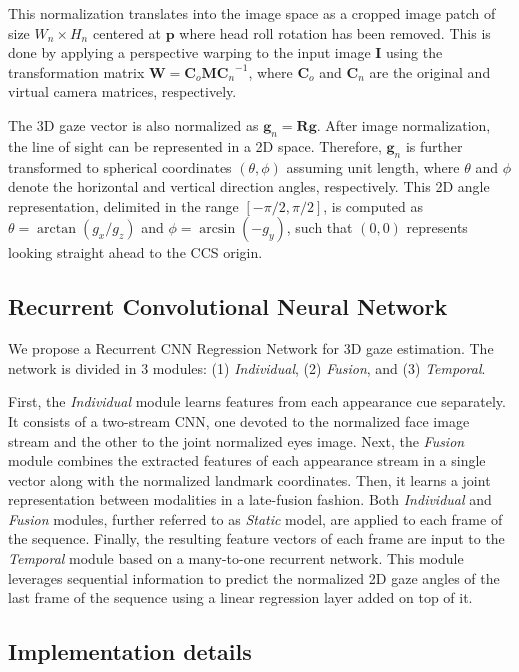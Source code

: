 \documentclass{bmvc2k}
\begin{document}
This normalization translates into the image space as a cropped image patch of size $W_n \times H_n$ centered at $\mathbf{p}$ where head roll rotation has been removed. This is done by applying a perspective warping to the input image $\mathbf{I}$ using the transformation matrix $\mathbf{W} = \mathbf{C}_o\mathbf{M}{\mathbf{C}_n}^{-1}$, where $\mathbf{C}_o$ and $\mathbf{C}_n$ are the original and virtual camera matrices, respectively.

The 3D gaze vector is also normalized as $\mathbf{g}_n = \mathbf{R}\mathbf{g}$. After image normalization, the line of sight can be represented in a 2D space. Therefore, $\mathbf{g}_n$ is further transformed to spherical coordinates $(\theta,\phi)$ assuming unit length, where $\theta$ and $\phi$ denote the horizontal and vertical direction angles, respectively. This 2D angle representation, delimited in the range $[-\pi/2, \pi/2]$, is computed as $\theta = \arctan(g_x / g_z)$ and $\phi = \arcsin(-g_y)$, such that $(0,0)$ represents looking straight ahead to the CCS origin.

\subsection{Recurrent Convolutional Neural Network}
\label{sec:arch}

We propose a Recurrent CNN Regression Network for 3D gaze estimation. The network is divided in 3 modules: (1) \textit{Individual}, (2) \textit{Fusion}, and (3) \textit{Temporal}. 

First, the \textit{Individual} module learns features from each appearance cue separately. It consists of a two-stream CNN, one devoted to the normalized face image stream and the other to the joint normalized eyes image. Next, the \textit{Fusion} module combines the extracted features of each appearance stream in a single vector along with the normalized landmark coordinates. Then, it learns a joint representation between modalities in a late-fusion fashion. Both \textit{Individual} and \textit{Fusion} modules, further referred to as \textit{Static} model, are applied to each frame of the sequence. Finally, the resulting feature vectors of each frame are input to the \textit{Temporal} module based on a many-to-one recurrent network. This module leverages sequential information to predict the normalized 2D gaze angles of the last frame of the sequence using a linear regression layer added on top of it. 

\subsection{Implementation details}
\label{sec:implementation}
\end{document}
